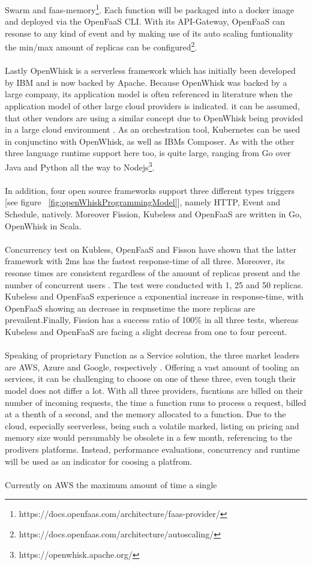 \documentclass[11pt]{article}
\begin{document}
Swarm and faas-memory\footnote{https://docs.openfaas.com/architecture/faas-provider/}. Each function will be packaged into a docker image and deployed via the OpenFaaS CLI. With its API-Gateway, OpenFaaS can resonse to any kind of event and by making use of its auto scaling funtionality the min/max amount of replicas can be configured\footnote{https://docs.openfaas.com/architecture/autoscaling/}.\\\\ Lastly OpenWhisk is a serverless framework which has initially been developed by IBM and is now backed by Apache. Because OpenWhisk was backed by a large company, its application model is often referenced in literature when the application model of other large cloud providers is indicated. it can be assumed, that other vendors are using a similar concept due to OpenWhisk being provided in a large cloud environment \cite{van2019spec}. As an orchestration tool, Kubernetes can be used in conjunctino with OpenWhisk, as well as IBMs Composer. As with the other three language runtime support here too, is quite large, ranging from Go over Java and Python all the way to Nodejs\footnote{https://openwhisk.apache.org/}.\\\\ In addition, four open source frameworks support three different types triggers [see figure ~\ref{fig:openWhiskProgrammingModel}], namely HTTP, Event and Schedule, natively. Moreover Fission, Kubeless and OpenFaaS are written in Go, OpenWhisk in Scala.\\\\ Concurrency test on Kubless, OpenFaaS and Fisson have shown that the latter framework with 2ms has the fastest response-time of all three. Moreover, its resonse times are consistent regardless of the amount of replicas present and the number of concurrent users \cite{mohanty2018evaluation}. The test were conducted with 1, 25 and 50 replicas. Kubeless and OpenFaaS experience a exponential increase in response-time, with OpenFaaS showing an decrease in respnsetime the more replicas are prevailent.Finally, Fission has a success ratio of 100\% in all three tests, whereas Kubeless and OpenFaaS are facing a slight decreas from one to four percent. \\\\ Speaking of proprietary Function as a Service solution, the three market leaders are AWS, Azure and Google, respectively \cite{kumar2019serverless}. Offering a vast amount of tooling an services, it can be challenging to choose on one of these three, even tough their model does not differ a lot. With all three providers, fucntions are billed on their number of incoming requests, the time a function runs to process a request, billed at a thenth of a second, and the memory allocated to a function. Due to the cloud, especially seerverless, being such a volatile marked, listing on pricing and memory size would persumably be obsolete in a few month, referencing to the prodivers platforms. Instead, performance evaluations, concurrency and runtime will be used as an indicator for coosing a platfrom.\\\\ Currently on AWS the maximum amount of time a single 
\end{document}
